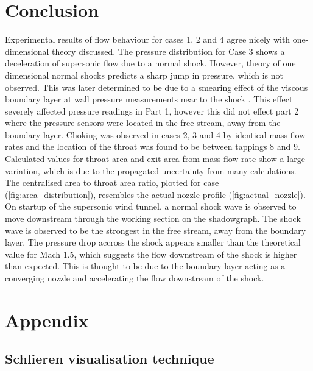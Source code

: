 \documentclass{article}
\begin{document}
\section{Conclusion}

Experimental results of flow behaviour for cases 1, 2 and 4 agree nicely with one-dimensional theory discussed.
The pressure distribution for Case 3 shows a deceleration of supersonic flow due to a normal shock.
However, theory of one dimensional normal shocks predicts a sharp jump in pressure, which is not observed.
This was later determined to be due to a smearing effect of the viscous boundary layer at wall pressure measurements near to the shock \cite{babinsky_delery:2011}.
This effect severely affected pressure readings in Part 1, however this did not effect part 2 where the pressure sensors were located in the free-stream, away from the boundary layer.
Choking was observed in cases 2, 3 and 4 by identical mass flow rates and the location of the throat was found to be between tappings 8 and 9.
Calculated values for throat area and exit area from mass flow rate show a large variation, which is due to the propagated uncertainty from many calculations.
The centralised area to throat area ratio, plotted for case (\ref{fig:area_distribution}), resembles the actual nozzle profile (\ref{fig:actual_nozzle}).
On startup of the supersonic wind tunnel, a normal shock wave is observed to move downstream through the working section on the shadowgraph.
The shock wave is observed to be the strongest in the free stream, away from the boundary layer.
The pressure drop accross the shock appears smaller than the theoretical value for Mach 1.5, which suggests the flow downstream of the shock is higher than expected.
This is thought to be due to the boundary layer acting as a converging nozzle and accelerating the flow downstream of the shock.



\iftrue

\newpage
\section{Appendix}

\subsection{Schlieren visualisation technique}
\end{document}
